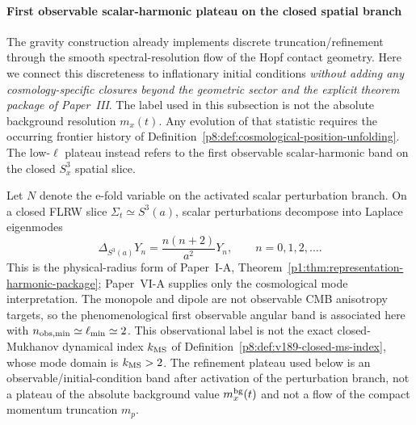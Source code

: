 \documentclass[12pt,a4paper]{article}
\begin{document}
\paragraph{First observable scalar-harmonic plateau on the closed spatial branch}
\label{p8:subsec:bh-plateau}

The gravity construction already implements discrete truncation/refinement through the smooth spectral-resolution flow of the Hopf contact geometry. Here we connect this discreteness to inflationary
initial conditions \emph{without adding any cosmology-specific closures beyond
the geometric sector and the explicit theorem package of Paper~III}.  The
label used in this subsection is not the absolute background resolution
\(m_x(t)\).  Any evolution of that statistic requires the occurring frontier
history of Definition~\ref{p8:def:cosmological-position-unfolding}.  The
low-\(\ell\) plateau instead refers to the first observable scalar-harmonic
band on the closed \(S^3_x\) spatial slice.

\begin{definition}
\label{p8:def:bh-mx}
Let \(N\) denote the e-fold variable on the activated scalar perturbation branch.  On a closed FLRW slice \(\Sigma_t\simeq S^3(a)\), scalar perturbations decompose into Laplace eigenmodes
\begin{equation}
\label{p8:eq:S3-scalar-harmonics}
\Delta_{S^3(a)}Y_n=\frac{n(n+2)}{a^2}Y_n,
\qquad n=0,1,2,\ldots .
\end{equation}
This is the physical-radius form of Paper~I-A, Theorem~\ref{p1:thm:representation-harmonic-package}; Paper~VI-A supplies only the cosmological mode interpretation.
The monopole and dipole are not observable CMB anisotropy targets, so the phenomenological first observable angular band is associated here with \(n_{\rm obs,min}\simeq\ell_{\min}\simeq2\).  This observational label is not the exact closed-Mukhanov dynamical index \(k_{\rm MS}\) of Definition~\ref{p8:def:v189-closed-ms-index}, whose mode domain is \(k_{\rm MS}>2\).  The refinement plateau used below is an observable/initial-condition band after activation of the perturbation branch, not a plateau of the absolute background value \(m_x^{\rm bg}(t)\) and not a flow of the compact momentum truncation \(m_p\).
\end{definition}
\end{document}
